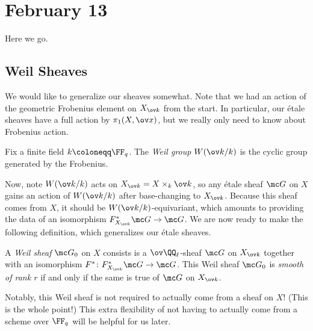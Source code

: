 \documentclass[../notes.tex]{subfiles}
\begin{document}
\section{February 13}

Here we go.

\subsection{Weil Sheaves}
We would like to generalize our sheaves somewhat. Note that we had an action of the geometric Frobenius element on $X_{\ov k}$ from the start. In particular, our \'etale sheaves have a full action by $\pi_1(X,\ov x)$, but we really only need to know about Frobenius action.
\begin{definition}
	Fix a finite field $k\coloneqq\FF_q$. The \textit{Weil group} $W(\ov k/k)$ is the cyclic group generated by the Frobenius.
\end{definition}
Now, note $W(\ov k/k)$ acts on $X_{\ov k}=X\times_k\ov k$, so any \'etale sheaf $\mc G$ on $X$ gains an action of $W(\ov k/k)$ after base-changing to $X_{\ov k}$. Because this sheaf comes from $X$, it should be $W(\ov k/k)$-equivariant, which amounts to providing the data of an isomorphism $F_{X_{\ov k}}^*\mc G\to\mc G$. We are now ready to make the following definition, which generalizes our \'etale sheaves.
\begin{definition}
	A \textit{Weil sheaf} $\mc G_0$ on $X$ consists is a $\ov\QQ_\ell$-sheaf $\mc G$ on $X_{\ov k}$ together with an isomorphism $F^*\colon F^*_{X_{\ov k}}\mc G\to\mc G$. This Weil sheaf $\mc G_0$ is \textit{smooth of rank $r$} if and only if the same is true of $\mc G$ on $X_{\ov k}$.
\end{definition}
Notably, this Weil sheaf is not required to actually come from a sheaf on $X$! (This is the whole point!) This extra flexibility of not having to actually come from a scheme over $\FF_q$ will be helpful for us later.
\end{document}
